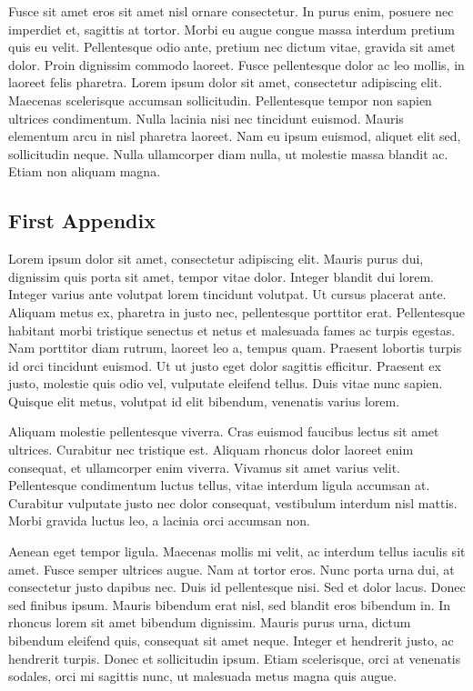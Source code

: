 \documentclass[twocolumn,10pt]{article}
\begin{document}
Fusce sit amet eros sit amet nisl ornare consectetur. In purus enim, posuere nec imperdiet et, sagittis at tortor. Morbi eu augue congue massa interdum pretium quis eu velit. Pellentesque odio ante, pretium nec dictum vitae, gravida sit amet dolor. Proin dignissim commodo laoreet. Fusce pellentesque dolor ac leo mollis, in laoreet felis pharetra. Lorem ipsum dolor sit amet, consectetur adipiscing elit. Maecenas scelerisque accumsan sollicitudin. Pellentesque tempor non sapien ultrices condimentum. Nulla lacinia nisi nec tincidunt euismod. Mauris elementum arcu in nisl pharetra laoreet. Nam eu ipsum euismod, aliquet elit sed, sollicitudin neque. Nulla ullamcorper diam nulla, ut molestie massa blandit ac. Etiam non aliquam magna. 

\onecolumn

\begin{bibliographyenv}
    
    
\end{bibliographyenv}

\begin{appendixenv}[Appendix]
    \section{First Appendix} \label{apx:first-appendix}

    Lorem ipsum dolor sit amet, consectetur adipiscing elit. Mauris purus dui, dignissim quis porta sit amet, tempor vitae dolor. Integer blandit dui lorem. Integer varius ante volutpat lorem tincidunt volutpat. Ut cursus placerat ante. Aliquam metus ex, pharetra in justo nec, pellentesque porttitor erat. Pellentesque habitant morbi tristique senectus et netus et malesuada fames ac turpis egestas. Nam porttitor diam rutrum, laoreet leo a, tempus quam. Praesent lobortis turpis id orci tincidunt euismod. Ut ut justo eget dolor sagittis efficitur. Praesent ex justo, molestie quis odio vel, vulputate eleifend tellus. Duis vitae nunc sapien. Quisque elit metus, volutpat id elit bibendum, venenatis varius lorem. 

    Aliquam molestie pellentesque viverra. Cras euismod faucibus lectus sit amet ultrices. Curabitur nec tristique est. Aliquam rhoncus dolor laoreet enim consequat, et ullamcorper enim viverra. Vivamus sit amet varius velit. Pellentesque condimentum luctus tellus, vitae interdum ligula accumsan at. Curabitur vulputate justo nec dolor consequat, vestibulum interdum nisl mattis. Morbi gravida luctus leo, a lacinia orci accumsan non.

    Aenean eget tempor ligula. Maecenas mollis mi velit, ac interdum tellus iaculis sit amet. Fusce semper ultrices augue. Nam at tortor eros. Nunc porta urna dui, at consectetur justo dapibus nec. Duis id pellentesque nisi. Sed et dolor lacus. Donec sed finibus ipsum. Mauris bibendum erat nisl, sed blandit eros bibendum in. In rhoncus lorem sit amet bibendum dignissim. Mauris purus urna, dictum bibendum eleifend quis, consequat sit amet neque. Integer et hendrerit justo, ac hendrerit turpis. Donec et sollicitudin ipsum. Etiam scelerisque, orci at venenatis sodales, orci mi sagittis nunc, ut malesuada metus magna quis augue. 
\end{appendixenv}
\end{document}
